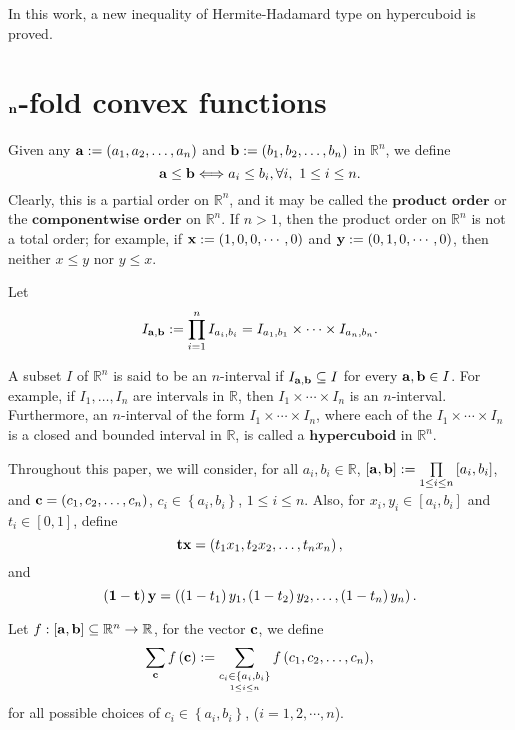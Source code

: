 \documentclass{amsart}
\theoremstyle{plain}
\numberwithin{equation}{section}
\begin{document}
In this work, a new inequality of Hermite-Hadamard type on
hypercuboid is proved.


\section{${\bf{n}}$-fold convex functions}
Given any ${\bf{a}}: = \left( {a_1 ,a_2 , \ldots ,a_n } \right)$
and ${\bf{b}}: = \left( {b_1 ,b_2 , \ldots ,b_n } \right)$ in
$\mathbb{R}^n$, we define
\begin{equation*}
{\bf{a}} \le {\bf{b}} \Longleftrightarrow a_i  \le b_i ,\forall
i,\,\,1 \le i \le n.
\end{equation*}
Clearly, this is a partial order on $\mathbb{R}^n$, and it may be
called the $\mathbf{product \,\,order}$ or the
$\mathbf{componentwise \,\,order}$ on $\mathbb{R}^n$. If $n > 1$,
then the product order on $\mathbb{R}^n$ is not a total order; for
example, if ${\bf{x}} := (1, 0, 0, \cdots , 0)$ and ${\bf{y}} :=
(0, 1, 0, \cdots , 0)$, then neither $x \le y$ nor $y \le x$.

Let
$$I_{{\bf{a}},{\bf{b}}} : = \prod\limits_{i = 1}^n {I_{a_i ,b_i }
}  = I_{a_1 ,b_1 }  \times \cdots  \times I_{a_n ,b_n }.$$

A subset $I$ of $\mathbb{R}^n$ is said to be an $n$-interval if
$I_{{\bf{a}},{\bf{b}}} \subseteq I$ for every ${\bf{a}},{\bf{b}}
\in I$. For example, if $I_1, \ldots , I_n$ are intervals in
$\mathbb{R}$, then $I_1  \times  \cdots  \times I_n$  is an
$n$-interval. Furthermore, an $n$-interval of the form $I_1 \times
\cdots  \times I_n$, where each of the $I_1  \times  \cdots \times
I_n$ is a closed and bounded interval in $\mathbb{R}$, is called a
$\textbf{hypercuboid}$ in $\mathbb{R}^n$.

Throughout this paper, we will consider, for all $a_i ,b_i  \in
\mathbb{R}$, $\left[ {{\bf{a}},{\bf{b}}} \right]: =
\prod\limits_{1 \le i \le n} {\left[ {a_i ,b_i } \right]}$, and
${\bf{c}} = \left( {c_1 ,c_2 , \ldots ,c_n } \right)$, $c_i  \in
\left\{ {a_i ,b_i } \right\}$, $1 \le i \le n$. Also, for $x_i
,y_i  \in \left[ {a_i ,b_i } \right]$ and $t_i \in [0,1]$, define
$${\bf{t}} {\bf{x}}= \left( {t_1 x_1 ,t_2 x_2 , \ldots ,t_n x_n }
\right),$$ and
$$\left( {{\bf{1}} - {\bf{t}}} \right){\bf{y}} = \left( {\left( {1 - t_1 } \right)y_1 ,\left( {1 - t_2 } \right)y_2 , \ldots ,\left( {1 - t_n } \right)y_n } \right).$$

Let $f: \left[ {{\bf{a}},{\bf{b}}} \right]\subseteq \mathbb{R}^n
\to \mathbb{R}$, for the vector ${\bf{c}}$, we define
\begin{align*}
\sum\limits_{{\bf{c}}} {f\left( {{\bf{c}}} \right)} : =
\sum\limits_{\mathop {c_{i}   \in \left\{ {a_{i} ,b_{i} }
\right\}}\limits_{1 \le i\le n} } {f\left( {c_1 ,c_2 , \ldots ,c_n
} \right)},
\end{align*}
for all possible choices of $c_{i}  \in \left\{ {a_{i} ,b_{i} }
\right\}$, ($i=1,2,\cdots,n$).
\end{document}
